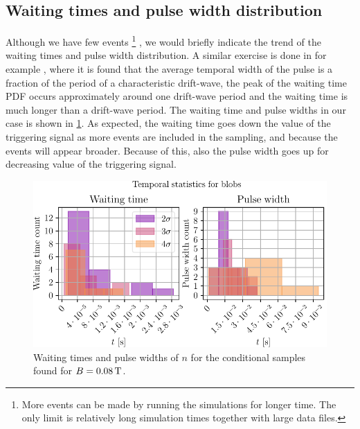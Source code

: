\subsection{Waiting times and pulse width distribution}
%
Although we have few events%
\footnote{
    More events can be made by running the simulations for longer time.
    The only limit is relatively long simulation times together with large data files.
}
%
, we would briefly indicate the trend of the waiting times and pulse width distribution.
A similar exercise is done in for example \cite{Hornung2011}, where it is found that the average temporal width of the pulse is a fraction of the period of a characteristic drift-wave, the peak of the waiting time PDF occurs approximately around one drift-wave period and the waiting time is much longer than a drift-wave period.
The waiting time and pulse widths in our case is shown in \cref{fig:tempStatBlob}.
As expected, the waiting time goes down the value of the triggering signal as more events are included in the sampling, and because the events will appear broader.
Because of this, also the pulse width goes up for decreasing value of the triggering signal.
%
\begin{figure}[h!]
    \begin{center}
        \includegraphics{fig/results/blobs/blobStatsB0_008Tweak}
    \end{center}
    \caption{
        Waiting times and pulse widths of $n$ for the conditional samples found for $B=0.08\, \text{T}$.
    }
    \label{fig:tempStatBlob}
\end{figure}
